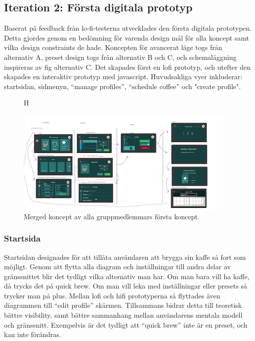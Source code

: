 \subsection{Iteration 2: Första digitala prototyp}


Baserat på feedback från lo-fi-testerna utvecklades den första digitala prototypen.  Detta gjordes genom en bedömning för varenda design mål för alla koncept samt vilka design constraints de hade. Koncepten för avancerat läge togs från alternativ A, preset design togs från alternativ B och C, och schemaläggning inspireras av fig alternativ C. Det skapades först en lofi prototyp, och utefter den skapades en interaktiv prototyp med javascript. Huvudsakliga vyer inkluderar: startsidan, sidmenyn, “manage profiles”, “schedule coffee” och "create profile".

\begin{figure}{H}
    \begin{center}
        \includegraphics[width=0.95\textwidth]{bilder/victorM.png}
    \end{center}
    \caption{Merged koncept av alla gruppmedlemmars första koncept.}
    \label{fig:mergedV}
\end{figure}

\subsubsection{Startsida}

Startsidan designades för att tillåta användaren att brygga sin kaffe så fort som möjligt. Genom att flytta alla diagram och inställningar till andra delar av gränssnittet blir det tydligt vilka alternativ man har. Om man bara vill ha kaffe, då trycks det på quick brew. Om man vill leka med inställningar eller presets så trycker man på plus. Mellan lofi och hifi prototyperna så flyttades även diagrammen till “edit profile” skärmen. Tillsammans bidrar detta till teoretisk bättre visibility, samt bättre sammanhang mellan användarens mentala modell och gränssnitt. Exempelvis är det tydligt att “quick brew” inte är en preset, och kan inte förändras. 

